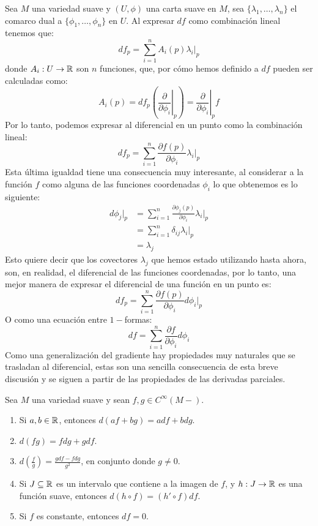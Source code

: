 Sea $M$ una variedad suave y $(U,\phi)$ una carta suave en $M$, sea $\{\lambda_1, \ldots, \lambda_n\}$ el comarco dual a $\{\phi_1,\ldots, \phi_n\}$ en $U$. Al expresar $df$ como combinación lineal tenemos que:\[
	df_p = \sum_{i=1}^n A_i(p) \lambda_i |_p
\]
donde $A_i: U \to \mathbb{R}$ son $n$ funciones, que, por cómo hemos definido a $df$ pueden ser calculadas como:
\[
	A_i(p)
	= df_p \left( \left. \frac{\partial}{\partial \phi_i} \right|_{p}\right)
	= \left. \frac{\partial}{\partial \phi_i} \right|_{p} f
\]
Por lo tanto, podemos expresar al diferencial en un punto como la combinación lineal:
\[
	df_p = \sum_{i=1}^n \frac{\partial f(p)}{\partial \phi_i} \lambda_i|_p
\]
Esta última igualdad tiene una consecuencia muy interesante, al considerar a la función $f$ como alguna de las funciones coordenadas $\phi_i$ lo que obtenemos es lo siguiente:
\begin{align*}
	d\phi_j|_p
	 & = \sum_{i=1}^n \frac{\partial \phi_j(p)}{\partial \phi_i} \lambda_i |_p \\
	 & = \sum_{i=1}^n \delta_{ij} \lambda_i|_p                                 \\
	 & = \lambda_j
\end{align*}
Esto quiere decir que los covectores $\lambda_j$ que hemos estado utilizando hasta ahora, son, en realidad, el diferencial de las funciones coordenadas, por lo tanto, una mejor manera de expresar el diferencial de una función en un punto es:
\[
	df_p = \sum_{i=1}^n \frac{\partial f(p)}{\partial \phi_i} d\phi_i |_p
\]
O como una ecuación entre $1-$formas:
\[
	df = \sum_{i=1}^n \frac{\partial f}{\partial \phi_i} d\phi_i
\]
Como una generalización del gradiente hay propiedades muy naturales que se trasladan al diferencial, estas son una sencilla consecuencia de esta breve discusión y se siguen a partir de las propiedades de las derivadas parciales.
\begin{corollary}
	Sea $M$ una variedad suave y sean $f,g \in C^{\infty}(M-)$.
	\begin{enumerate}
		\item Si $a,b \in \mathbb{R}$, entonces $d(af+bg) = adf + bdg$.
		\item $d(fg) = fdg + gdf$.
		\item $d(\frac{f}{g}) = \frac{gdf - fdg}{g^2}$, en conjunto donde $g \neq 0$.
		\item Si $J \subseteq \mathbb{R}$ es un intervalo que contiene a la imagen de $f$, y $h: J \to \mathbb{R}$ es una función suave, entonces $d(h \circ f) = (h' \circ f)df$.
		\item Si $f$ es constante, entonces $df = 0$.
	\end{enumerate}
\end{corollary}

